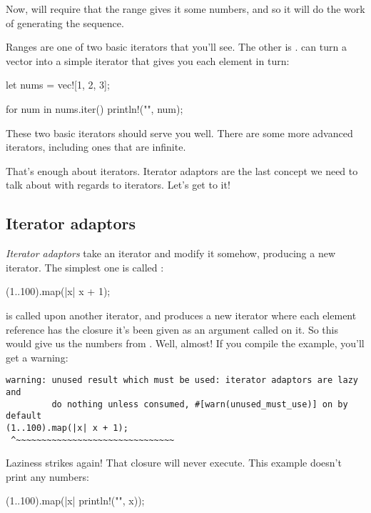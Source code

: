 Now,  will require that the range gives it some numbers, and so it will do the work of generating the sequence.

\blank

Ranges are one of two basic iterators that you'll see. The other is .  can turn a vector into a simple 
iterator that gives you each element in turn:

\begin{rustc}
let nums = vec![1, 2, 3];

for num in nums.iter() {
   println!("{}", num);
}
\end{rustc}

These two basic iterators should serve you well. There are some more advanced iterators, including ones that are infinite.

\blank

That's enough about iterators. Iterator adaptors are the last concept we need to talk about with regards to iterators. Let's get to it!

\subsection*{Iterator adaptors}

\emph{Iterator adaptors} take an iterator and modify it somehow, producing a new iterator. The simplest one is called :

\begin{rustc}
(1..100).map(|x| x + 1);
\end{rustc}

 is called upon another iterator, and produces a new iterator where each element reference has the closure it's been given 
as an argument called on it. So this would give us the numbers from . Well, almost! If you compile the example, you'll 
get a warning:

\begin{verbatim}
warning: unused result which must be used: iterator adaptors are lazy and
         do nothing unless consumed, #[warn(unused_must_use)] on by default
(1..100).map(|x| x + 1);
 ^~~~~~~~~~~~~~~~~~~~~~~~~~~~~~~~
\end{verbatim}

Laziness strikes again! That closure will never execute. This example doesn't print any numbers:

\begin{rustc}
(1..100).map(|x| println!("{}", x));
\end{rustc}

